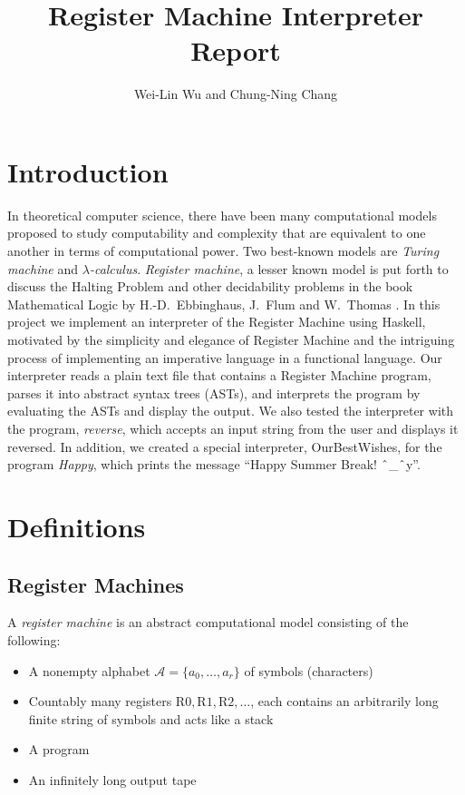 \documentclass[a4paper]{article}
\title{Register Machine Interpreter Report}
\author{Wei-Lin Wu and Chung-Ning Chang}
\newcommand{\sete}[1]{\{#1\}}
\newcommand{\alphabet}{\mathcal{A}}
\newcommand{\reg}[1]{\mathrm{R}#1}
\begin{document}
\maketitle


\section{Introduction}

In theoretical computer science, there have been many computational models proposed 
to study computability and complexity that are equivalent to one another in terms of computational power. 
Two best-known models are \emph{Turing machine} and \emph{$\lambda$-calculus}. 
\emph{Register machine}, a lesser known model is put forth to discuss the Halting Problem and other decidability problems in the book Mathematical Logic by H.-D.\ Ebbinghaus, J.\ Flum and W.\ Thomas \cite{ebbinghaus2013mathematical}.
In this project we implement an interpreter of the Register Machine using Haskell, motivated by the simplicity and elegance of Register Machine and the intriguing process of implementing an imperative language in a functional language.
Our interpreter reads a plain text file that contains a Register Machine program, parses it into abstract syntax trees (ASTs), and interprets the program by evaluating the ASTs and display the output.
We also tested the interpreter with the program, \emph{reverse}, which accepts an input string from the user and displays it reversed. In addition, we created a special interpreter, OurBestWishes, for the program \emph{Happy}, which prints the message ``Happy Summer Break! $\string^$\_$\string^$y''.


\section{Definitions}

\subsection{Register Machines}

A \emph{register machine} is an abstract computational model consisting of the following:
\begin{itemize}
\item A nonempty alphabet $\alphabet = \sete{a_0, \ldots, a_r}$ of symbols (characters)
\item Countably many registers $\reg{0}, \reg{1}, \reg{2}, \ldots$,
each contains an arbitrarily long finite string of symbols and acts like a stack
\item A program
\item An infinitely long output tape
\end{itemize}
\end{document}

